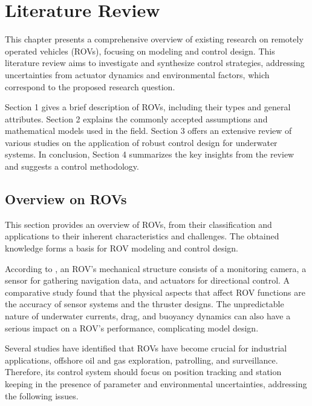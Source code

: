 \chapter{Literature Review}
\label{chap:lr}


    This chapter presents a comprehensive overview of existing research on remotely operated vehicles (ROVs), focusing on modeling and control design. This literature review aims to investigate and synthesize control strategies, addressing uncertainties from actuator dynamics and environmental factors, which correspond to the proposed research question.

    Section 1 gives a brief description of ROVs, including their types and general attributes. Section 2 explains the commonly accepted assumptions and mathematical models used in the field. Section 3 offers an extensive review of various studies on the application of robust control design for underwater systems. In conclusion, Section 4 summarizes the key insights from the review and suggests a control methodology.

\section{Overview on ROVs}

    This section provides an overview of ROVs, from their classification and applications to their inherent characteristics and challenges. The obtained knowledge forms a basis for ROV modeling and control design.

    According to \cite{rov_review}, an ROV's mechanical structure consists of a monitoring camera, a sensor for gathering navigation data, and actuators for directional control. A comparative study \cite{overview2} found that the physical aspects that affect ROV functions are the accuracy of sensor systems and the thruster designs. The unpredictable nature of underwater currents, drag,
    and buoyancy dynamics can also have a serious impact on a ROV's performance, complicating model design.

    Several studies \cite{rov_application, overview} have identified that ROVs have become crucial for industrial applications,
    offshore oil and gas exploration, patrolling, and surveillance. Therefore, its control system
    should focus on position tracking and station keeping in the presence of parameter and environmental uncertainties, addressing the following issues.

